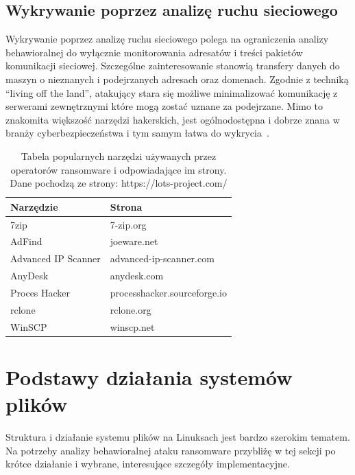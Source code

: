 \subsection{Wykrywanie poprzez analizę ruchu sieciowego}
Wykrywanie poprzez analizę ruchu sieciowego polega na ograniczenia analizy behawioralnej do wyłącznie monitorowania adresatów i treści pakietów komunikacji sieciowej.
Szczególne zainteresowanie stanowią transfery danych do maszyn o nieznanych i podejrzanych adresach
oraz domenach. Zgodnie z techniką \foreignquote{english}{living off the land}, atakujący stara się
możliwe minimalizować komunikację z serwerami zewnętrznymi które mogą zostać uznane za podejrzane. Mimo to 
znakomita większość narzędzi hakerskich, jest ogólnodostępna i dobrze znana w branży
cyberbezpieczeństwa i tym samym łatwa do wykrycia~\cite{sans_secure}.  
\begin{table}[H]
    \centering
    \begin{tabular}{ll}
    \hline
    \multicolumn{1}{|l|}{Narzędzie} & \multicolumn{1}{l|}{Strona}  \\ \hline
    7zip                            & 7-zip.org                    \\
    AdFind                          & joeware.net                  \\
    Advanced IP Scanner             & advanced-ip-scanner.com      \\
    AnyDesk                         & anydesk.com                  \\
    Proces Hacker                   & processhacker.sourceforge.io \\
    rclone                          & rclone.org                   \\
    WinSCP                          & winscp.net                  
    \end{tabular}
    \caption{Tabela popularnych narzędzi używanych przez operatorów ransomware i odpowiadające im strony. Dane pochodzą ze strony: https://lots-project.com/}
\end{table}
\section{Podstawy działania systemów plików}
Struktura i działanie systemu plików na Linuksach jest bardzo szerokim tematem.
Na potrzeby analizy behawioralnej ataku ransomware przybliżę w tej sekcji po krótce działanie i 
wybrane, interesujące szczegóły implementacyjne.
